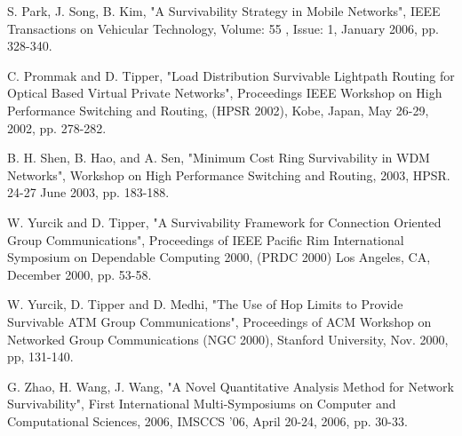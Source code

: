 \documentclass[conference]{IEEEtran}
\begin{document}
\begin{thebibliography}{00}
         S. Park, J. Song, B. Kim, "A Survivability Strategy in Mobile Networks", IEEE Transactions on Vehicular Technology, Volume: 55 , Issue: 1, January 2006, pp. 328-340.

         C. Prommak and D. Tipper, "Load Distribution Survivable Lightpath Routing for Optical Based Virtual Private Networks", Proceedings IEEE Workshop on High Performance Switching and Routing, (HPSR 2002), Kobe, Japan, May 26-29, 2002, pp. 278-282.

         B. H. Shen, B. Hao, and A. Sen, "Minimum Cost Ring Survivability in WDM Networks", Workshop on High Performance Switching and Routing, 2003, HPSR. 24-27 June 2003, pp. 183-188.

         W. Yurcik and D. Tipper, "A Survivability Framework for Connection Oriented Group Communications", Proceedings of IEEE Pacific Rim International Symposium on Dependable Computing 2000, (PRDC 2000) Los Angeles, CA, December 2000, pp. 53-58.

         W. Yurcik, D. Tipper and D. Medhi, "The Use of Hop Limits to Provide Survivable ATM Group Communications", Proceedings of ACM Workshop on Networked Group Communications (NGC 2000), Stanford University, Nov. 2000, pp, 131-140.

         G. Zhao, H. Wang, J. Wang, "A Novel Quantitative Analysis Method for Network Survivability", First International Multi-Symposiums on Computer and Computational Sciences, 2006, IMSCCS '06, April 20-24, 2006, pp. 30-33.

    \end{thebibliography}
\end{document}
